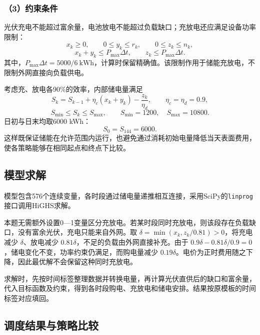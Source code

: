 \subsubsection*{（3）约束条件}
光伏充电不能超过富余量，电池放电不能超过负载缺口；充放电还应满足设备功率限制：
\begin{equation}
x_k\ge0,\qquad 0\le y_k\le r_k,\qquad 0\le z_k\le n_k,
\label{eq:q1_supply_constraint}
\end{equation}
\begin{equation}
x_k+y_k\le P_{\max}\Delta t,\qquad z_k\le P_{\max}\Delta t.
\label{eq:q1_power_constraint}
\end{equation}
其中，$P_{\max}\Delta t=5000/6\ \mathrm{kWh}$，计算时保留精确值。该限制作用于储能充放电，不限制外网直接向负载供电。

考虑充、放电各90\%的效率，内部储电量满足
\begin{equation}
S_k=S_{k-1}+\eta_c(x_k+y_k)-\frac{z_k}{\eta_d},\qquad \eta_c=\eta_d=0.9,
\label{eq:q1_soc_transition}
\end{equation}
\begin{equation}
S_{\min}\le S_k\le S_{\max},\qquad S_{\min}=1200,\quad S_{\max}=10800.
\label{eq:q1_soc_bound}
\end{equation}
日初与日末均取6000 kWh：
\begin{equation}
S_0=S_{144}=6000.
\label{eq:q1_terminal_constraint}
\end{equation}
这样既保证储能在允许范围内运行，也避免通过消耗初始电量降低当天表面费用，使各策略能够在相同起点和终点下比较。

\subsection{模型求解}
模型包含576个连续变量，各时段通过储电量递推相互连接，采用SciPy的\texttt{linprog}接口调用HiGHS求解。

本题无需额外设置0—1变量区分充放电。若某时段同时充放电，则该段存在负载缺口，没有富余光伏，充电只能来自外网。取 $\delta=\min(x_k,z_k/0.81)>0$，将充电减少 $\delta$、放电减少 $0.81\delta$，不足的负载由外网直接补充。由于 $0.9\delta-0.81\delta/0.9=0$，储电变化不变，功率约束仍满足，而购电量减少 $0.19\delta$。电价为正时费用随之下降，因此最优解不会保留这种同时充放电。

求解时，先按时间标签整理数据并转换电量，再计算光伏直供后的缺口和富余量，代入目标函数及约束，得到各时段购电、充放电和储电安排。结果按原模板的时间标签对应填回。

\subsection{调度结果与策略比较}
